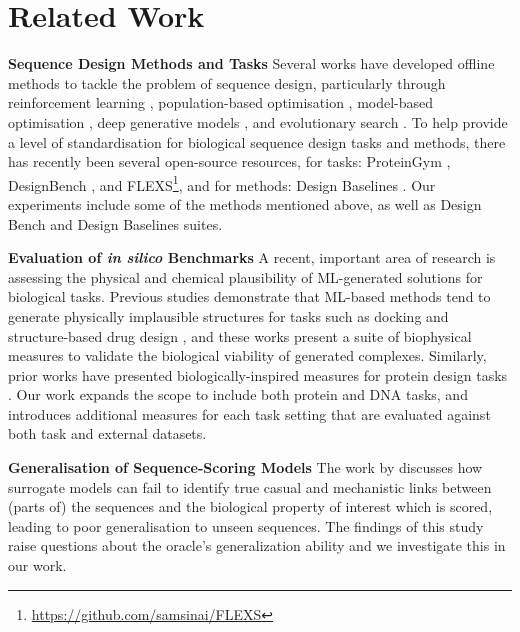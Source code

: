 \section{Related Work}
\label{sec:related_work}

\textbf{Sequence Design Methods and Tasks}
Several works have developed offline methods to tackle the problem of sequence design, particularly through reinforcement learning \cite{angermueller2019model}, population-based optimisation \cite{angermueller2020population}, model-based optimisation \cite{coms, chen2023bidirectional}, deep generative models \cite{mins_kumar, gflownets, bootgen}, and evolutionary search \cite{pex}.
To help provide a level of standardisation for biological sequence design tasks and methods, there has recently been several open-source resources, for tasks:  ProteinGym \cite{notin2024proteingym}, DesignBench \cite{designbench_trabucco}, and FLEXS\footnote{\url{https://github.com/samsinai/FLEXS}}, and for methods: Design Baselines \cite{coms}. Our experiments include some of the methods mentioned above, as well as Design Bench and Design Baselines suites.

\textbf{Evaluation of \textit{in silico} Benchmarks} A recent, important area of research is assessing the physical and chemical plausibility of ML-generated solutions for biological tasks. Previous studies demonstrate that ML-based methods tend to generate physically implausible structures for tasks such as docking \cite{posebusters} and structure-based drug design \cite{posecheck}, and these works present a suite of biophysical measures to validate the biological viability of generated complexes. Similarly, prior works have presented biologically-inspired measures for protein design tasks \cite{frey2023protein, spinner2024well}. Our work expands the scope to include both protein and DNA tasks, and introduces additional measures for each task setting that are evaluated against both task and external datasets. 

\textbf{Generalisation of Sequence-Scoring Models} The work by \citet{tagasovska2023antibody} discusses how surrogate models can fail to identify true casual and mechanistic links between (parts of) the sequences and the biological property of interest which is scored, leading to poor generalisation to unseen sequences. The findings of this study raise questions about the oracle's generalization ability and we investigate this in our work.